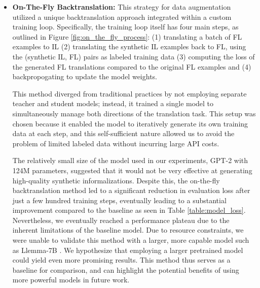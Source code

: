 \documentclass{article} %
\begin{document}
\begin{itemize}
\item \textbf{On-The-Fly Backtranslation: }This strategy for data augmentation utilized a unique backtranslation approach integrated within a custom training loop. Specifically, the training loop itself has four main steps, as outlined in Figure \ref{fig:on_the_fly_process}: (1) translating a batch of FL examples to IL (2) translating the synthetic IL examples back to FL, using the (synthetic IL, FL) pairs as labeled training data (3) computing the loss of the generated FL translations compared to the original FL examples and (4) backpropogating to update the model weights.

This method diverged from traditional practices by not employing separate teacher and student models; instead, it trained a single model to simultaneously manage both directions of the translation task. This setup was chosen because it enabled the model to iteratively generate its own training data at each step, and this self-sufficient nature allowed us to avoid the problem of limited labeled data without incurring large API costs. 

The relatively small size of the model used in our experiments, GPT-2 with 124M parameters, suggested that it would not be very effective at generating high-quality synthetic informalizations. Despite this, the on-the-fly backtranslation method led to a significant reduction in evaluation loss after just a few hundred training steps, eventually leading to a substantial improvement compared to the baseline as seen in Table \ref{table:model_loss}. Nevertheless, we eventually reached a performance plateau due to the inherent limitations of the baseline model. Due to resource constraints, we were unable to validate this method with a larger, more capable model such as Llemma-7B \citep{azerbayev2023llemma}. We hypothesize that employing a larger pretrained model could yield even more promising results. \label{methods:onthefly} This method thus serves as a baseline for comparison, and can highlight the potential benefits of using more powerful models in future work.

\begin{figure}[ht]
\centering
{}
\end{figure}
\end{itemize}
\end{document}
